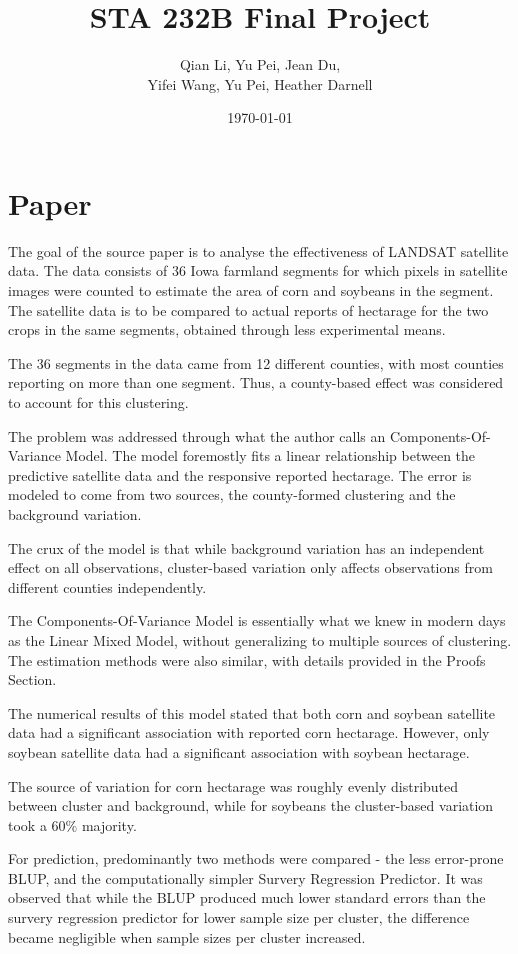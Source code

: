 \documentclass[11pt,letter]{article}
\title{\textbf{STA 232B Final Project}}
\author{Qian Li, Yu Pei, Jean Du, \\
Yifei Wang, Yu Pei, Heather Darnell}
\date{\today}
\begin{document}
\maketitle

\section{Paper}

The goal of the source paper is to analyse the effectiveness of LANDSAT satellite data. The data consists of 36 Iowa farmland segments for which pixels in satellite images were counted to estimate the area of corn and soybeans in the segment. The satellite data is to be compared to actual reports of hectarage for the two crops in the same segments, obtained through less experimental means.

The 36 segments in the data came from 12 different counties, with most counties reporting on more than one segment. Thus, a county-based effect was considered to account for this clustering.

The problem was addressed through what the author calls an Components-Of-Variance Model. The model foremostly fits a linear relationship between the predictive satellite data and the responsive reported hectarage. The error is modeled to come from two sources, the county-formed clustering and the background variation.

The crux of the model is that while background variation has an independent effect on all observations, cluster-based variation only affects observations from different counties independently.

The Components-Of-Variance Model is essentially what we knew in modern days as the Linear Mixed Model, without generalizing to multiple sources of clustering. The estimation methods were also similar, with details provided in the Proofs Section.

The numerical results of this model stated that both corn and soybean satellite data had a significant association with reported corn hectarage. However, only soybean satellite data had a significant association with soybean hectarage.

The source of variation for corn hectarage was roughly evenly distributed between cluster and background, while for soybeans the cluster-based variation took a $60\%$ majority.

For prediction, predominantly two methods were compared - the less error-prone BLUP, and the computationally simpler Survery Regression Predictor. It was observed that while the BLUP produced much lower standard errors than the survery regression predictor for lower sample size per cluster, the difference became negligible when sample sizes per cluster increased.
\end{document}
